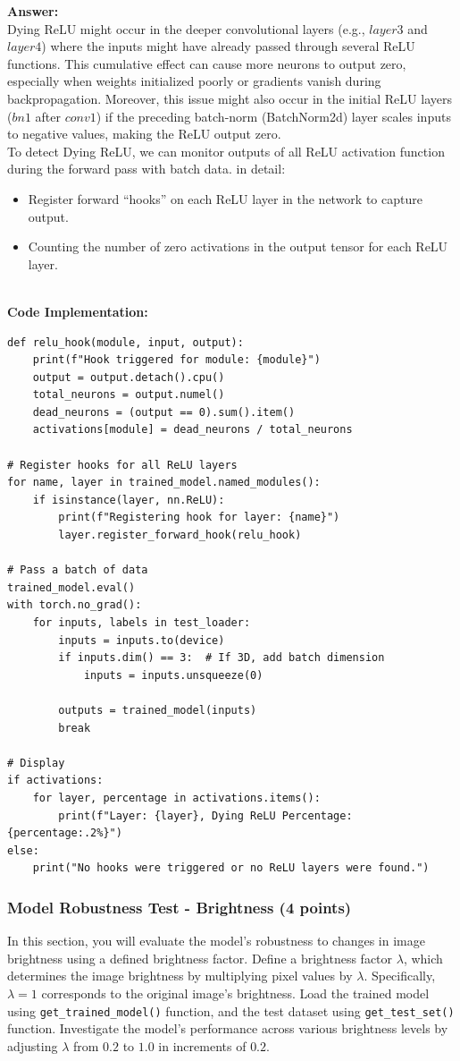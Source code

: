 \documentclass[11pt, oneside]{article}   	%
\begin{document}
\textbf{Answer:} \\
Dying ReLU might occur in the deeper convolutional layers (e.g., $layer3$ and $layer4$) where the inputs might have already passed through several ReLU functions. This cumulative effect can cause more neurons to output zero, especially when weights initialized poorly or gradients vanish during backpropagation. Moreover, this issue might also occur in the initial ReLU layers ($bn1$ after $conv1$) if the preceding batch-norm (BatchNorm2d) layer scales inputs to negative values, making the ReLU output zero.
\\
To detect Dying ReLU, we can monitor outputs of all ReLU activation function during the forward pass with batch data. in detail:
\begin{itemize}
    \item Register forward ``hooks'' on each ReLU layer in the network to capture output.
    \item Counting the number of zero activations in the output tensor for each ReLU layer.
\end{itemize}
\\
\textbf{Code Implementation: }
\begin{verbatim}
def relu_hook(module, input, output):
    print(f"Hook triggered for module: {module}")
    output = output.detach().cpu()
    total_neurons = output.numel()
    dead_neurons = (output == 0).sum().item()
    activations[module] = dead_neurons / total_neurons

# Register hooks for all ReLU layers
for name, layer in trained_model.named_modules():
    if isinstance(layer, nn.ReLU):
        print(f"Registering hook for layer: {name}")
        layer.register_forward_hook(relu_hook)

# Pass a batch of data
trained_model.eval()
with torch.no_grad():
    for inputs, labels in test_loader:
        inputs = inputs.to(device)
        if inputs.dim() == 3:  # If 3D, add batch dimension
            inputs = inputs.unsqueeze(0)

        outputs = trained_model(inputs)
        break

# Display
if activations:
    for layer, percentage in activations.items():
        print(f"Layer: {layer}, Dying ReLU Percentage: {percentage:.2%}")
else:
    print("No hooks were triggered or no ReLU layers were found.")
\end{verbatim}

\subsubsection*{Model Robustness Test - Brightness (4 points)}
In this section, you will evaluate the model's robustness to changes in image brightness using a defined brightness factor.
Define a brightness factor $\lambda$, which determines the image brightness by multiplying pixel values by $\lambda$. Specifically, $\lambda = 1$ corresponds to the original image's brightness.
Load the trained model using \texttt{get\_trained\_model()} function, and the test dataset using \texttt{get\_test\_set()} function.  Investigate the model's performance across various brightness levels by adjusting $\lambda$ from $0.2$ to $1.0$ in increments of $0.2$. 
\end{document}
